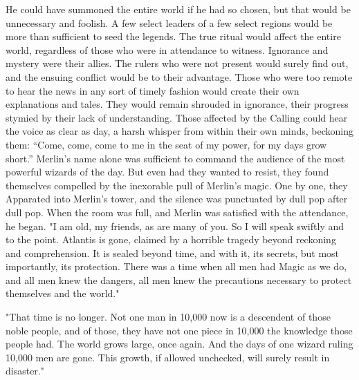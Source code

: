 He could have summoned the entire world if he had so chosen, but that would be unnecessary and foolish. A few select leaders of a few select regions would be more than sufficient to seed the legends. The true ritual would affect the entire world, regardless of those who were in attendance to witness.
\SmallVSpace
Ignorance and mystery were their allies. The rulers who were not present would surely find out, and the ensuing conflict would be to their advantage. Those who were too remote to hear the news in any sort of timely fashion would create their own explanations and tales. They would remain shrouded in ignorance, their progress stymied by their lack of understanding.
\SmallVSpace
Those affected by the Calling could hear the voice as clear as day, a harsh whisper from within their own minds, beckoning them: “Come, come, come to me in the seat of my power, for my days grow short.”
\SmallVSpace
Merlin’s name alone was sufficient to command the audience of the most powerful wizards of the day. But even had they wanted to resist, they found themselves compelled by the inexorable pull of Merlin’s magic. One by one, they Apparated into Merlin’s tower, and the silence was punctuated by dull pop after dull pop. When the room was full, and Merlin was satisfied with the attendance, he began.
\SmallVSpace
"I am old, my friends, as are many of you. So I will speak swiftly and to the point. Atlantis is gone, claimed by a horrible tragedy beyond reckoning and comprehension. It is sealed beyond time, and with it, its secrets, but most importantly, its protection. There was a time when all men had Magic as we do, and all men knew the dangers, all men knew the precautions necessary to protect themselves and the world."

"That time is no longer. Not one man in 10,000 now is a descendent of those noble people, and of those, they have not one piece in 10,000 the knowledge those people had. The world grows large, once again. And the days of one wizard ruling 10,000 men are gone. This growth, if allowed unchecked, will surely result in disaster."

